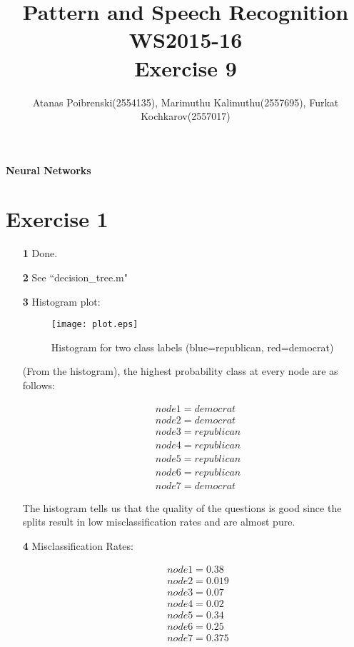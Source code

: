 \documentclass[a4paper]{article}
\title{Pattern and Speech Recognition WS2015-16 \\ Exercise 9}
\author{Atanas Poibrenski(2554135), Marimuthu Kalimuthu(2557695), Furkat Kochkarov(2557017)}
\begin{document}

\maketitle 
\begin{center}
	\textbf{Neural Networks}
\end{center}

\section*{Exercise 1}
\begin{enumerate}
	\item[ \textbf{1} ] Done.
	\item[ \textbf{2} ] See ``decision\_tree.m"
	\item[ \textbf{3} ] Histogram plot:
	\begin{figure}[H]
		\begin{center}
			\texttt{[image: plot.eps]}
			\caption{Histogram for two class labels (blue=republican, red=democrat) }\label{fig:hist_1.3}
		\end{center}
	\end{figure}
	
	(From the histogram), the highest probability class at every node are as follows:
	
	\begin{tcolorbox}
	\begin{align*}
		& node1 = democrat  \\
		& node2 = democrat   \\
		& node3 = republican  \\
		& node4 = republican  \\
		& node5 = republican \\
		& node6 = republican \\
		& node7 = democrat		
	\end{align*}
	\end{tcolorbox}
			
	The histogram tells us that the quality of the questions is good since the splits result in low misclassification rates and are almost pure.
	
	\item[ \textbf{4} ] Misclassification Rates:
	    \begin{tcolorbox}
		\begin{align*}
			& node1 = 0.38 \\
			& node2 = 0.019 \\
			& node3 = 0.07  \\
			& node4 = 0.02  \\
			& node5 = 0.34  \\
			& node6 = 0.25  \\
			& node7 = 0.375
		\end{align*}
    \end{tcolorbox}
    

\end{enumerate}
\end{document}
